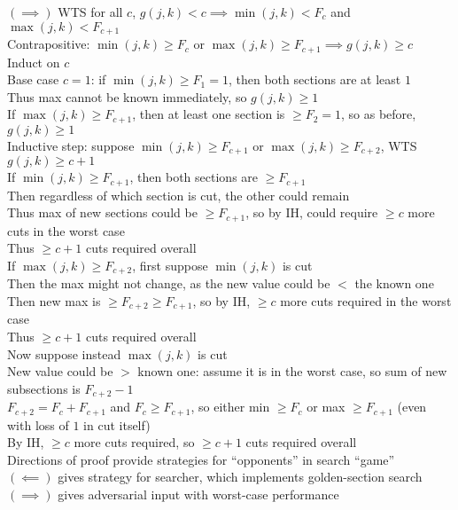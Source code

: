 \documentclass{article}
\begin{document}
$(\implies)$ WTS for all $c$,
$g(j, k) < c \implies \min(j, k) < F_c$ and $\max(j, k) < F_{c+1}$ \\
Contrapositive: $\min(j, k) \geq F_c$ or $\max(j, k) \geq F_{c+1} \implies g(j, k) \geq c$ \\
Induct on $c$ \\
Base case $c = 1$: if $\min(j, k) \geq F_1 = 1$,
then both sections are at least $1$ \\
Thus max cannot be known immediately, so $g(j, k) \geq 1$ \\
If $\max(j, k) \geq F_{c+1}$, then at least one section is $\geq F_2 = 1$,
so as before, $g(j, k) \geq 1$ \\
Inductive step: suppose $\min(j, k) \geq F_{c+1}$ or $\max(j, k) \geq F_{c+2}$,
WTS $g(j, k) \geq c+1$ \\
If $\min(j, k) \geq F_{c+1}$, then both sections are $\geq F_{c+1}$ \\
Then regardless of which section is cut, the other could remain \\
Thus max of new sections could be $\geq F_{c+1}$,
so by IH, could require $\geq c$ more cuts in the worst case \\
Thus $\geq c+1$ cuts required overall \\
If $\max(j, k) \geq F_{c+2}$,
first suppose $\min(j, k)$ is cut \\
Then the max might not change,
as the new value could be $<$ the known one \\
Then new max is $\geq F_{c+2} \geq F_{c+1}$,
so by IH, $\geq c$ more cuts required in the worst case \\
Thus $\geq c+1$ cuts required overall \\
Now suppose instead $\max(j, k)$ is cut \\
New value could be $>$ known one: assume it is in the worst case,
so sum of new subsections is $F_{c+2}-1$ \\
$F_{c+2} = F_c+F_{c+1}$ and $F_c \geq F_{c+1}$,
so either min $\geq F_c$ or max $\geq F_{c+1}$
(even with loss of $1$ in cut itself) \\
By IH, $\geq c$ more cuts required, so $\geq c+1$ cuts required overall \\

Directions of proof provide strategies for ``opponents'' in search ``game'' \\
$(\impliedby)$ gives strategy for searcher, which implements golden-section search \\
$(\implies)$ gives adversarial input with worst-case performance \\
\end{document}
